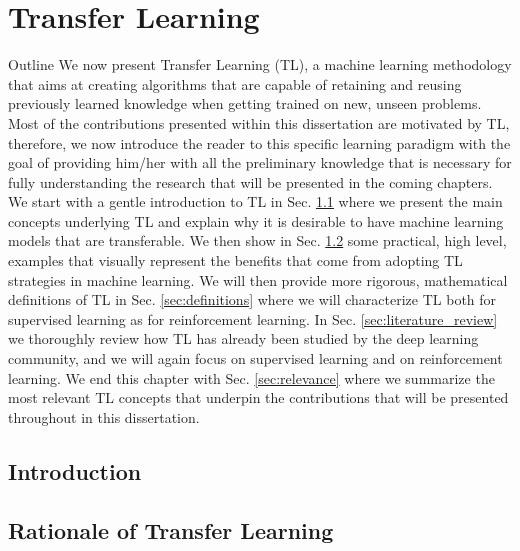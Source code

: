 \chapter{Transfer Learning}
\label{ch:transfer_learnimg}

\begin{remark}{Outline}
	We now present Transfer Learning (TL), a machine learning methodology that aims at creating algorithms that are capable of retaining and reusing previously learned knowledge when getting trained on new, unseen problems. Most of the contributions presented within this dissertation are motivated by TL, therefore, we now introduce the reader to this specific learning paradigm with the goal of providing him/her with all the preliminary knowledge that is necessary for fully understanding the research that will be presented in the coming chapters. We start with a gentle introduction to TL in Sec. \ref{sec:tl_introduction} where we present the main concepts underlying TL and explain why it is desirable to have machine learning models that are transferable. We then show in Sec. \ref{sec:rationale} some practical, high level, examples that visually represent the benefits that come from adopting TL strategies in machine learning. We will then provide more rigorous, mathematical definitions of TL in Sec. \ref{sec:definitions} where we will characterize TL both for supervised learning as for reinforcement learning. In Sec. \ref{sec:literature_review} we thoroughly review how TL has already been studied by the deep learning community, and we will again focus on supervised learning and on reinforcement learning. We end this chapter with Sec. \ref{sec:relevance} where we summarize the most relevant TL concepts that underpin the contributions that will be presented throughout in this dissertation.  
\end{remark}

\section{Introduction}
\label{sec:tl_introduction}


\section{Rationale of Transfer Learning}
\label{sec:rationale}

